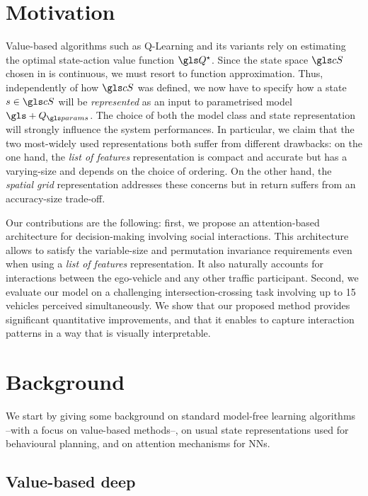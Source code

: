 \section{Motivation}

Value-based  algorithms such as Q-Learning \citep{Watkins1992} and its variants rely on estimating the optimal state-action value function $\Q^\star$. Since the state space $\cS$ chosen in  is continuous, we must resort to function approximation. Thus, independently of how $\cS$ was defined, we now have to specify how a state $s\in\cS$ will be \textit{represented} as an input to parametrised model $\gls+{Q}_\params$. The choice of both the model class and state representation will strongly influence the system performances. In particular, we claim that the two most-widely used representations both suffer from different drawbacks: on the one hand, the \emph{list of features} representation is compact and accurate but has a varying-size and depends on the choice of ordering. On the other hand, the \emph{spatial grid} representation addresses these concerns but in return suffers from an accuracy-size trade-off.

Our contributions are the following: first, we propose an attention-based architecture for decision-making involving social interactions. This architecture allows to satisfy the variable-size and permutation invariance requirements even when using a \emph{list of features} representation. It also naturally accounts for interactions between the ego-vehicle and any other traffic participant.
Second, we evaluate our model on a challenging intersection-crossing task involving up to 15 vehicles perceived simultaneously. We show that our proposed method provides significant quantitative improvements, and that it enables to capture interaction patterns in a way that is visually interpretable.

\section{Background}

\label{sec:background}

We start by giving some background on standard model-free learning algorithms --with a focus on value-based methods--, on usual state representations used for behavioural planning, and on attention mechanisms for \glspl{NN}.

\subsection{Value-based deep }

